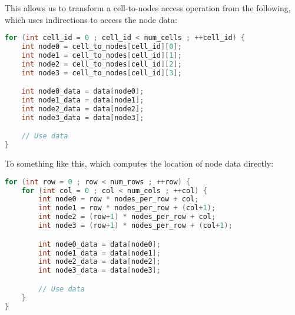 This allows us to transform a cell-to-nodes access operation from the following, which uses indirections to access the node data:
\begin{lstlisting}[language=c++]
for (int cell_id = 0 ; cell_id < num_cells ; ++cell_id) {
	int node0 = cell_to_nodes[cell_id][0];
	int node1 = cell_to_nodes[cell_id][1];
	int node2 = cell_to_nodes[cell_id][2];
	int node3 = cell_to_nodes[cell_id][3];

	int node0_data = data[node0];
	int node1_data = data[node1];
	int node2_data = data[node2];
	int node3_data = data[node3];

	// Use data
}
\end{lstlisting}

To something like this, which computes the location of node data directly:
\begin{lstlisting}[language=c++]
for (int row = 0 ; row < num_rows ; ++row) {
	for (int col = 0 ; col < num_cols ; ++col) {
		int node0 = row * nodes_per_row + col;
		int node1 = row * nodes_per_row + (col+1);
		int node2 = (row+1) * nodes_per_row + col;
		int node3 = (row+1) * nodes_per_row + (col+1);

		int node0_data = data[node0];
		int node1_data = data[node1];
		int node2_data = data[node2];
		int node3_data = data[node3];

		// Use data
	}
}
\end{lstlisting}
